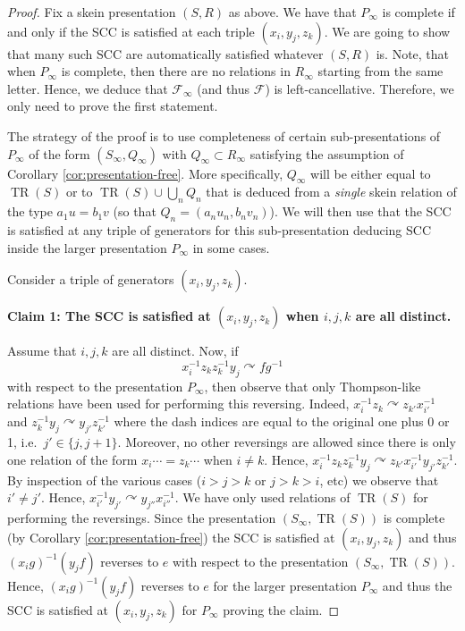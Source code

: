 \documentclass[a4paper, 12pt]{amsart}
\numberwithin{equation}{section}
\theoremstyle{definition}
\newcommand{\act}{\curvearrowright}
\newcommand{\cF}{\mathcal F}
\DeclareMathOperator{\TR}{TR}
\begin{document}
\begin{proof}
Fix a skein presentation $(S,R)$ as above.
We have that $P_\infty$ is complete if and only if the SCC is satisfied at each triple $(x_i,y_j,z_k)$.
We are going to show that many such SCC are automatically satisfied whatever $(S,R)$ is.
Note, that when $P_\infty$ is complete, then there are no relations in $R_\infty$ starting from the same letter. 
Hence, we deduce that $\cF_\infty$ (and thus $\cF$) is left-cancellative.
Therefore, we only need to prove the first statement.

The strategy of the proof is to use completeness of certain sub-presentations of $P_\infty$ of the form $(S_\infty, Q_\infty)$ with $Q_\infty\subset R_\infty$ satisfying the assumption of Corollary \ref{cor:presentation-free}.
More specifically, $Q_\infty$ will be either equal to $\TR(S)$ or to $\TR(S)\cup \bigcup_n Q_n$ that is deduced from a {\it single} skein relation of the type $a_{1}u=b_{1} v$ (so that $Q_n=(a_nu_n,b_nv_n)$).
We will then use that the SCC is satisfied at any triple of generators for this sub-presentation deducing SCC inside the larger presentation $P_\infty$ in some cases.

Consider a triple of generators $(x_i,y_j,z_k)$.

{\bf Claim 1: The SCC is satisfied at $(x_i,y_j,z_k)$ when $i,j,k$ are all distinct.}

Assume that $i,j,k$ are all distinct.
Now, if $$x_i^{-1} z_k z_k^{-1} y_j\act fg^{-1}$$ with respect to the presentation $P_\infty$, then observe that only Thompson-like relations have been used for performing this reversing.
Indeed, $x_i^{-1}z_k\act z_{k'} x_{i'}^{-1}$ and $z_k^{-1} y_j\act y_{j'} z_{k'}^{-1}$ where the dash indices are equal to the original one plus 0 or 1, i.e.~$j'\in\{j,j+1\}.$
Moreover, no other reversings are allowed since there is only one relation of the form $x_i\cdots=z_k\cdots$ when $i\neq k$.
Hence, $x_i^{-1} z_k z_k^{-1} y_j\act z_{k'} x_{i'}^{-1} y_{j'} z_{k'}^{-1}.$
By inspection of the various cases ($i>j>k$ or $j>k>i$, etc) we observe that $i'\neq j'$. 
Hence, $x_{i'}^{-1} y_{j'}\act y_{j''} x_{i''}^{-1}$. 
We have only used relations of $\TR(S)$ for performing the reversings.
Since the presentation $(S_\infty,\TR(S))$ is complete (by Corollary \ref{cor:presentation-free}) the SCC is satisfied at $(x_i,y_j,z_k)$ and thus $(x_i g)^{-1} (y_j f)$ reverses to $e$ with respect to the presentation $(S_\infty,\TR(S)).$
Hence, $(x_i g)^{-1} (y_j f)$ reverses to $e$ for the larger presentation $P_\infty$ and thus the SCC is satisfied at $(x_i,y_j,z_k)$ for $P_\infty$ proving the claim.


\end{proof}
\end{document}
